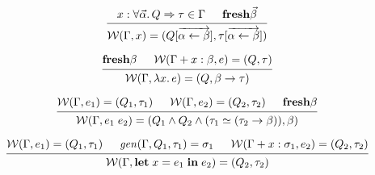 \documentclass[12pt]{article}
\begin{document}
\pagestyle{empty}

\[
    \begin{prooftree}
        \hypo{x:\forall \vec{\alpha}\ldotp Q \Rightarrow \tau \in \Gamma}
        \hypo{\mathbf{fresh} \vec{\beta}}
        \infer2{\mathcal{W}(\Gamma, x) = (Q[\overrightarrow{\alpha \leftarrow \beta}], \tau[\overrightarrow{\alpha \leftarrow \beta}])}
    \end{prooftree}
\]

\[
    \begin{prooftree}
        \hypo{\mathbf{fresh} \beta}
        \hypo{\mathcal{W}(\Gamma + x: \beta, e) = (Q, \tau)}
        \infer2{\mathcal{W}(\Gamma, \lambda x\ldotp e) = (Q, \beta \to \tau)}
    \end{prooftree}
\]

\[
    \begin{prooftree}
        \hypo{\mathcal{W}(\Gamma, e_1) = (Q_1, \tau_1)}
        \hypo{\mathcal{W}(\Gamma, e_2) = (Q_2, \tau_2)}
        \hypo{\mathbf{fresh} \beta}
        \infer3{\mathcal{W}(\Gamma, e_1\; e_2) = (Q_1 \land Q_2 \land (\tau_1 \simeq (\tau_2 \to \beta)), \beta)}
    \end{prooftree}
\]

\[
    \begin{prooftree}
        \hypo{\mathcal{W}(\Gamma, e_1) = (Q_1, \tau_1)}
        \hypo{\mathit{gen}(\Gamma, Q_1, \tau_1) = \sigma_1}
        \hypo{\mathcal{W}(\Gamma + x:\sigma_1, e_2) = (Q_2, \tau_2)}
        \infer3{\mathcal{W}(\Gamma, \mathbf{let}\; x = e_1\; \mathbf{in}\; e_2) = (Q_2, \tau_2)}
    \end{prooftree}
\]
\end{document}
